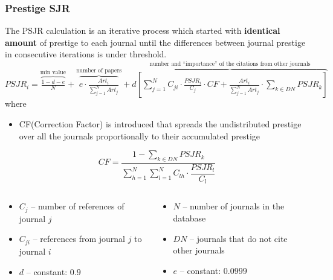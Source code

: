 \documentclass{beamer}
\begin{document}
\begin{frame}
    \frametitle{Prestige SJR}
    The PSJR calculation is an iterative process
    which started with \textbf{identical
        amount} of prestige to each journal until the differences
    between journal prestige in consecutive
    iterations is under threshold.
    \scalebox{0.84}
    {
        $
            PSJR_i = \overbrace{\frac{1-d-e}{N}}^{\text{min value}} +
            \overbrace{e \cdot \frac{Art_i}{\sum\limits_{j=1}^N Art_j}}^{\text{number of papers}} +
            \overbrace{d \left[ \sum\limits_{j=1}^N C_{ji} \cdot \frac{PSJR_i}{C_j} \cdot CF +
                    \frac{Art_i}{\sum\limits_{j=1}^N Art_j} \cdot \sum\limits_{k \in DN} PSJR_k \right]}^{\text{number and “importance” of the citations
                    from other journals}}
        $
    }
    where
    {
        \begin{itemize}
            \item CF(Correction Factor) is introduced that spreads the undistributed prestige
                  over all the journals proportionally to their accumulated prestige
        \end{itemize}
        \[
            CF = \frac{1 - \sum\limits_{k \in DN} PSJR_k}
            {\sum\limits_{h=1}^N \sum\limits_{l=1}^N C_{lh} \cdot \dfrac{PSJR_l}{C_l}}
        \]
    }
    {
        \begin{columns}[T]
            \begin{column}{.5\textwidth}
                \begin{itemize}
                    \item $C_j$ -- number of references of journal $j$
                    \item $C_{ji}$ -- references from journal $j$ to journal $i$
                    \item $d$ -- constant: $0.9$
                \end{itemize}
            \end{column}
            \begin{column}{.5\textwidth}
                \begin{itemize}
                    \item $N$ -- number of journals in the database
                    \item $DN$ -- journals that do not cite other journals
                    \item $e$ -- constant: $0.0999$
                \end{itemize}
            \end{column}
        \end{columns}
    }
\end{frame}
\end{document}
